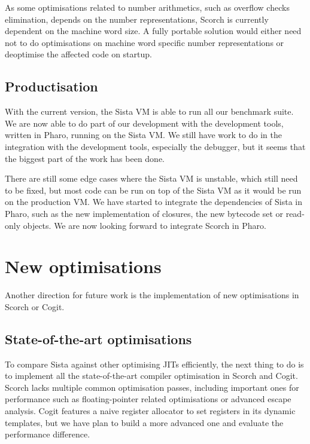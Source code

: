 \documentclass[a4paper,12pt,twoside]{../includes/ThesisStyle}
\begin{document}
As some optimisations related to number arithmetics, such as overflow checks elimination, depends on the number representations, Scorch is currently dependent on the machine word size. A fully portable solution would either need not to do optimisations on machine word specific number representations or deoptimise the affected code on startup.

\subsection{Productisation}
\label{ss:FWProduct}

With the current version, the Sista VM is able to run all our benchmark suite. We are now able to do part of our development with the development tools, written in Pharo, running on the Sista VM. We still have work to do in the integration with the development tools, especially the debugger, but it seems that the biggest part of the work has been done. 

There are still some edge cases where the Sista VM is unstable, which still need to be fixed, but most code can be run on top of the Sista VM as it would be run on the production VM. We have started to integrate the dependencies of Sista in Pharo, such as the new implementation of closures, the new bytecode set or read-only objects. We are now looking forward to integrate Scorch in Pharo.

\section{New optimisations}
\label{sec:newOpt}

Another direction for future work is the implementation of new optimisations in Scorch or Cogit. 

\subsection{State-of-the-art optimisations}

To compare Sista against other optimising JITs efficiently, the next thing to do is to implement all the state-of-the-art compiler optimisation in Scorch and Cogit. Scorch lacks multiple common optimisation passes, including important ones for performance such as floating-pointer related optimisations or advanced escape analysis. Cogit features a naive register allocator to set registers in its dynamic templates, but we have plan to build a more advanced one and evaluate the performance difference. 
\end{document}
